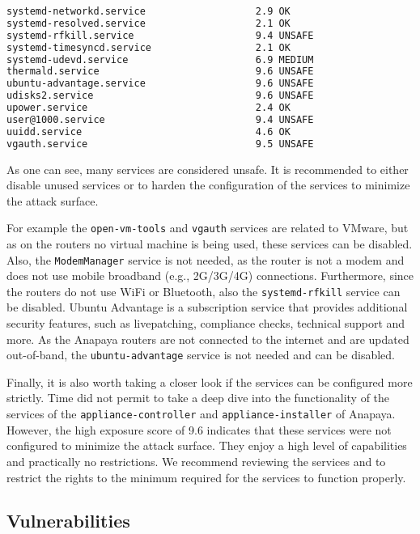 \begin{lstlisting}[language=bash, deletekeywords={local}, numbers=none, caption={Output of \texttt{systemd-analyze security}}]
systemd-networkd.service                   2.9 OK        
systemd-resolved.service                   2.1 OK        
systemd-rfkill.service                     9.4 UNSAFE    
systemd-timesyncd.service                  2.1 OK        
systemd-udevd.service                      6.9 MEDIUM    
thermald.service                           9.6 UNSAFE    
ubuntu-advantage.service                   9.6 UNSAFE    
udisks2.service                            9.6 UNSAFE    
upower.service                             2.4 OK        
user@1000.service                          9.4 UNSAFE    
uuidd.service                              4.6 OK        
vgauth.service                             9.5 UNSAFE    
\end{lstlisting}

As one can see, many services are considered unsafe.
It is recommended to either disable unused services or to harden the configuration of the services to minimize the attack surface.

For example the \texttt{open-vm-tools} and \texttt{vgauth} services are related to VMware, but as on the routers no virtual machine is being used, these services can be disabled.
Also, the \texttt{ModemManager} service is not needed, as the router is not a modem and does not use mobile broadband (e.g., 2G/3G/4G) connections.
Furthermore, since the routers do not use WiFi or Bluetooth, also the \texttt{systemd-rfkill} service can be disabled.
Ubuntu Advantage is a subscription service that provides additional security features, such as livepatching, compliance checks, technical support and more.
As the Anapaya routers are not connected to the internet and are updated out-of-band, the \texttt{ubuntu-advantage} service is not needed and can be disabled.

Finally, it is also worth taking a closer look if the services can be configured more strictly.
Time did not permit to take a deep dive into the functionality of the services of the \texttt{appliance-controller} and \texttt{appliance-installer} of Anapaya.
However, the high exposure score of 9.6 indicates that these services were not configured to minimize the attack surface.
They enjoy a high level of capabilities and practically no restrictions.
We recommend reviewing the services and to restrict the rights to the minimum required for the services to function properly.


\subsection{Vulnerabilities}
\label{sec:vulnerabilities}


